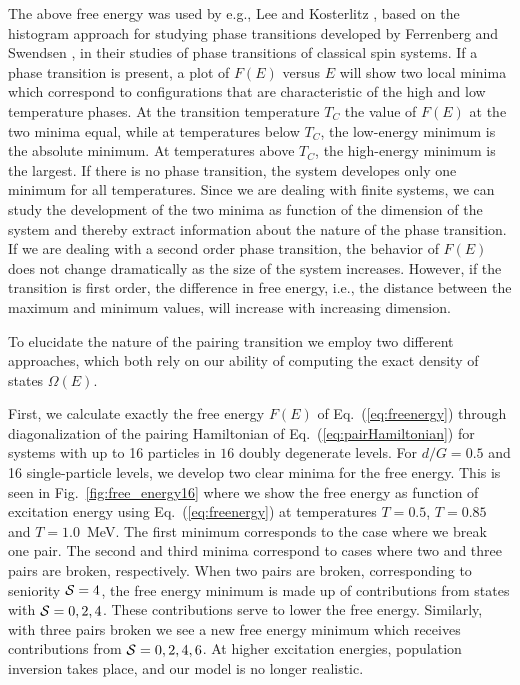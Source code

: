 \begin{multicols}{2}
The above free energy was used by e.g.,
Lee and Kosterlitz \cite{prl90},
based on the histogram approach for studying
phase transitions developed by Ferrenberg and Swendsen \cite{fs88},
in their studies of phase transitions
of classical spin systems. 
If a phase transition is present, a plot of $F(E)$ versus $E$ will show
two local minima which correspond to configurations that are
characteristic of the high and low temperature phases.
At the transition temperature $T_C$ the value of $F(E)$ at the 
two minima equal, while at temperatures below $T_C$, the low-energy
minimum is the absolute minimum. At temperatures above $T_C$, the high-energy
minimum is the largest. If there is no
phase transition, the system developes only one minimum for all temperatures.
Since we are dealing with finite systems, we can study the development 
of the two minima as function of the dimension of the system and thereby 
extract information about the nature of the phase transition. If we are dealing
with a second order phase transition, the behavior of $F(E)$ does not change
dramatically as the size of the system increases. However, if the transition
is first order, the difference in free energy, i.e., 
the distance between the maximum and minimum values, 
will increase with increasing dimension. 


To elucidate the nature
of the pairing transition we employ two different approaches,
which both rely on our ability of computing the exact density of states
$\Omega(E)$. 

First, we calculate exactly the  
free energy $F(E)$ of Eq.~(\ref{eq:freenergy})
through diagonalization of the pairing Hamiltonian of 
Eq.~(\ref{eq:pairHamiltonian})
for systems with up to 16 particles in $16$ doubly degenerate
levels. 
For $d/G=0.5$ and 16 single-particle levels, 
we develop two clear  minima for the free energy.
This is seen in
Fig.~\ref{fig:free_energy16} where we show the free energy as function of 
excitation energy
using Eq.~(\ref{eq:freenergy}) at temperatures 
$T=0.5$, $T=0.85$ and $T=1.0$~MeV.
The first minimum corresponds to the case where we break one pair.
The second and third minima  correspond
to cases where two and three pairs are broken, respectively. 
When two pairs are broken, corresponding to seniority ${\cal S}=4$, 
the free energy minimum is made up of contributions
from states with ${\cal S}=0,2,4$. These contributions serve to lower
the free energy. 
Similarly, with three pairs
broken we see a new free energy minimum which receives contributions
from ${\cal S}=0,2,4,6$.
At higher excitation energies, population
inversion takes place, and our model is no longer realistic. 


\end{multicols}
